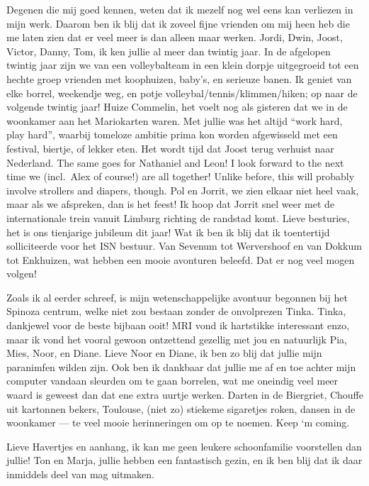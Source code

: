 \documentclass[11pt,american,a4paper,oneside,]{memoir} %
\begin{document}
Degenen die mij goed kennen, weten dat ik mezelf nog wel eens kan verliezen in mijn werk. Daarom ben ik blij dat ik zoveel fijne vrienden om mij heen heb die me laten zien dat er veel meer is dan alleen maar werken. Jordi, Dwin, Joost, Victor, Danny, Tom, ik ken jullie al meer dan twintig jaar. In de afgelopen twintig jaar zijn we van een volleybalteam in een klein dorpje uitgegroeid tot een hechte groep vrienden met koophuizen, baby's, en serieuze banen. Ik geniet van elke borrel, weekendje weg, en potje volleybal/tennis/klimmen/hiken; op naar de volgende twintig jaar! Huize Commelin, het voelt nog als gisteren dat we in de woonkamer aan het Mariokarten waren. Met jullie was het altijd ``work hard, play hard'', waarbij tomeloze ambitie prima kon worden afgewisseld met een festival, biertje, of lekker eten. Het wordt tijd dat Joost terug verhuist naar Nederland. The same goes for Nathaniel and Leon! I look forward to the next time we (incl.~Alex of course!) are all together! Unlike before, this will probably involve strollers and diapers, though. Pol en Jorrit, we zien elkaar niet heel vaak, maar als we afspreken, dan is het feest! Ik hoop dat Jorrit snel weer met de internationale trein vanuit Limburg richting de randstad komt. Lieve besturies, het is ons tienjarige jubileum dit jaar! Wat ik ben ik blij dat ik toentertijd solliciteerde voor het ISN bestuur. Van Sevenum tot Wervershoof en van Dokkum tot Enkhuizen, wat hebben een mooie avonturen beleefd. Dat er nog veel mogen volgen!

Zoals ik al eerder schreef, is mijn wetenschappelijke avontuur begonnen bij het Spinoza centrum, welke niet zou bestaan zonder de onvolprezen Tinka. Tinka, dankjewel voor de beste bijbaan ooit! MRI vond ik hartstikke interessant enzo, maar ik vond het vooral gewoon ontzettend gezellig met jou en natuurlijk Pia, Mies, Noor, en Diane. Lieve Noor en Diane, ik ben zo blij dat jullie mijn paranimfen wilden zijn. Ook ben ik dankbaar dat jullie me af en toe achter mijn computer vandaan sleurden om te gaan borrelen, wat me oneindig veel meer waard is geweest dan dat ene extra uurtje werken. Darten in de Biergriet, Chouffe uit kartonnen bekers, Toulouse, (niet zo) stiekeme sigaretjes roken, dansen in de woonkamer --- te veel mooie herinneringen om op te noemen. Keep `m coming.

Lieve Havertjes en aanhang, ik kan me geen leukere schoonfamilie voorstellen dan jullie! Ton en Marja, jullie hebben een fantastisch gezin, en ik ben blij dat ik daar inmiddels deel van mag uitmaken.
\end{document}
